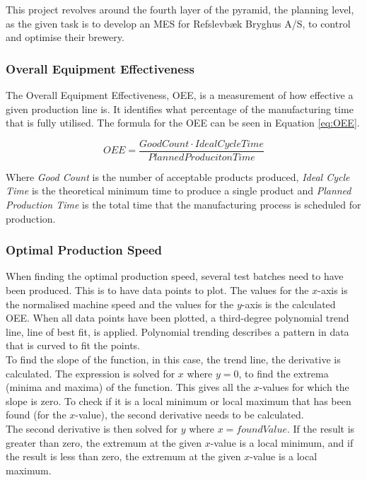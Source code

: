 This project revolves around the fourth layer of the pyramid, the planning
level, as the given task is to develop an MES for Refslevbæk Bryghus A/S, to
control and optimise their brewery. 


\subsubsection{Overall Equipment Effectiveness}
The Overall Equipment Effectiveness, OEE, is a measurement of how effective a
given production line is. It identifies what percentage of the manufacturing
time that is fully utilised. The formula for the OEE can be seen in Equation
\ref{eq:OEE}.

\begin{equation} \label{eq:OEE}
    OEE = \frac{Good Count \cdot Ideal Cycle Time}{Planned Produciton Time}
\end{equation}

Where \textit{Good Count} is the number of acceptable products produced,
\textit{Ideal Cycle Time} is the theoretical minimum time to produce a single
product and \textit{Planned Production Time} is the total time that the
manufacturing process is scheduled for production. \cite{oee}

\subsubsection{Optimal Production Speed}
When finding the optimal production speed, several test batches need to have
been produced. This is to have data points to plot. The values for the
\(x\)-axis is the normalised machine speed and the values for the \(y\)-axis is
the calculated OEE. When all data points have been plotted, a third-degree
polynomial trend line, line of best fit, is applied. Polynomial trending
describes a pattern in data that is curved to fit the points.\\

To find the slope of the function, in this case, the trend line, the derivative
is calculated. The expression is solved for \(x\) where \(y = 0\), to find the
extrema (minima and maxima) of the function. This gives all the \(x\)-values
for which the slope is zero. To check if it is a local minimum or local maximum
that has been found (for the \(x\)-value), the second derivative needs to be
calculated.\\

The second derivative is then solved for \(y\) where \(x = found Value\). If the
result is greater than zero, the extremum at the given \(x\)-value is a local
minimum, and if the result is less than zero, the extremum at the given 
\(x\)-value is a local maximum. \cite{ops} \\ 

